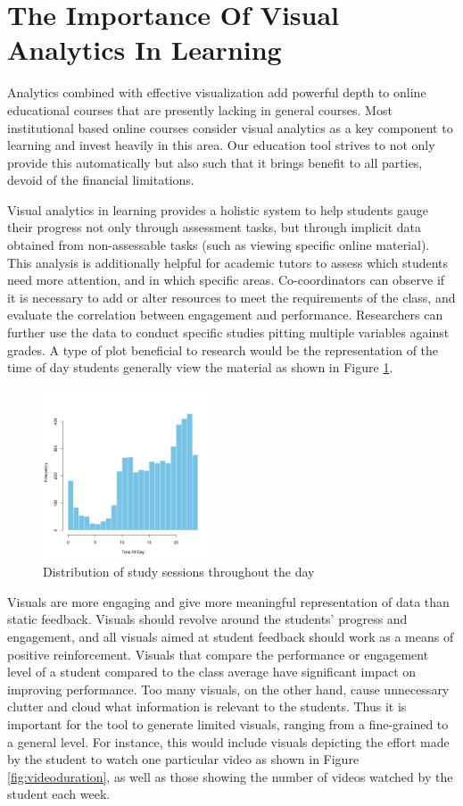 \documentclass[a4paper, 11pt, conference]{ieeeconf}
\begin{document}
\section{The Importance Of Visual Analytics In Learning}

Analytics combined with effective visualization add powerful depth to online educational courses that are presently lacking in general courses. Most institutional based online courses consider visual analytics as a key component to learning and invest heavily in this area. Our education tool strives to not only provide this automatically but also such that it brings benefit to all parties, devoid of the financial limitations.

Visual analytics in learning provides a holistic system to help students gauge their progress not only through assessment tasks, but through implicit data obtained from non-assessable tasks (such as viewing specific online material). This analysis is additionally helpful for academic tutors to assess which students need more attention, and in which specific areas. Co-coordinators can observe if it is necessary to add or alter resources to meet the requirements of the class, and evaluate the correlation between engagement and performance. Researchers can further use the data to conduct specific studies pitting multiple variables against grades. A type of plot beneficial to research would be the representation of the time of day students generally view the material as shown in Figure \ref{fig:timeofday}.

\begin{figure}
\centering
\includegraphics[width=0.45\textwidth]{timeofday.png}
\caption{\label{fig:timeofday}Distribution of study sessions throughout the day}
\end{figure}

Visuals are more engaging and give more meaningful representation of data than static feedback. 
Visuals should revolve around the students' progress and engagement, and all visuals aimed at student feedback should work as a means of positive reinforcement. Visuals that compare the performance or engagement level of a student compared to the class average have significant impact on improving performance. Too many visuals, on the other hand, cause unnecessary clutter and cloud what information is relevant to the students. Thus it is important for the tool to generate limited visuals, ranging from a fine-grained to a general level. For instance, this would include visuals depicting the effort made by the student to watch one particular video as shown in Figure \ref{fig:videoduration}, as well as those showing the number of videos watched by the student each week.
\end{document}
